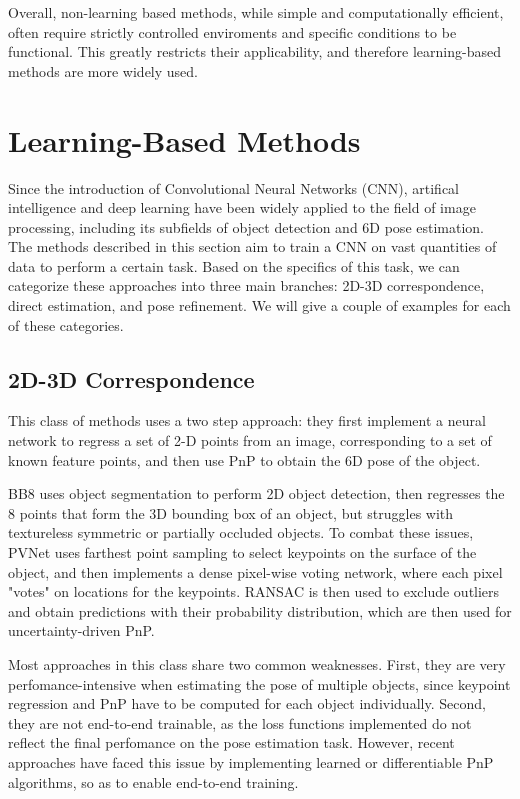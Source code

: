 Overall, non-learning based methods, while simple and computationally efficient, often require strictly controlled enviroments and specific conditions to be functional. This greatly restricts their applicability, and therefore learning-based methods are more widely used.

\section{Learning-Based Methods}
\label{s:learningbasedmethods}

Since the introduction of Convolutional Neural Networks (CNN), artifical intelligence and deep learning have been widely applied to the field of image processing, including its subfields of object detection and 6D pose estimation. The methods described in this section aim to train a CNN on vast quantities of data to perform a certain task. Based on the specifics of this task, we can categorize these approaches into three main branches: 2D-3D correspondence, direct estimation, and pose refinement. We will give a couple of examples for each of these categories.

\subsection{2D-3D Correspondence}
\label{ss:2D3D}

This class of methods uses a two step approach: they first implement a neural network to regress a set of 2-D points from an image, corresponding to a set of known feature points, and then use PnP to obtain the 6D pose of the object.

BB8\cite{BB8} uses object segmentation to perform 2D object detection, then regresses the 8 points that form the 3D bounding box of an object, but struggles with textureless symmetric or partially occluded objects. To combat these issues, PVNet\cite{PVNet} uses farthest point sampling to select keypoints on the surface of the object, and then implements a dense pixel-wise voting network, where each pixel "votes" on locations for the keypoints. RANSAC\cite{RANSAC} is then used to exclude outliers and obtain predictions with their probability distribution, which are then used for uncertainty-driven PnP.

Most approaches in this class share two common weaknesses. First, they are very perfomance-intensive when estimating the pose of multiple objects, since keypoint regression and PnP have to be computed for each object individually\cite{bukschat2020efficientpose}. Second, they are not end-to-end trainable, as the loss functions implemented do not reflect the final perfomance on the pose estimation task\cite{SS6D}. However, recent approaches have faced this issue by implementing learned or differentiable PnP algorithms, so as to enable end-to-end training\cite{EPro-Pnp}.


